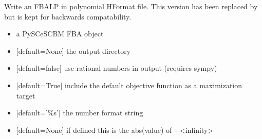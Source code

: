 \documentclass[letterpaper,10pt,english]{sphinxmanual}
\begin{document}

\begin{fulllineitems}
\label{\detokenize{modules_doc:cbmpy.CBWrite.writeModelHFormatFBA}}
\pysigstartsignatures
{}
\pysigstopsignatures
\sphinxAtStartPar
Write an FBA\sphinxhyphen{}LP in polynomial H\sphinxhyphen{}Format file. This version has been replaced by 
but is kept for backwards compatability.
\begin{itemize}
\item {} 
\sphinxAtStartPar
{} a PySCeS\sphinxhyphen{}CBM FBA object

\item {} 
\sphinxAtStartPar
{} {[}default=None{]} the output directory

\item {} 
\sphinxAtStartPar
{} {[}default=false{]} use rational numbers in output (requires sympy)

\item {} 
\sphinxAtStartPar
{} {[}default=True{]} include the default objective function as a maximization target

\item {} 
\sphinxAtStartPar
{} {[}default=’\%s’{]} the number format string

\item {} 
\sphinxAtStartPar
{} {[}default=None{]} if defined this is the abs(value) of +\sphinxhyphen{}\textless{}infinity\textgreater{}

\end{itemize}

\end{fulllineitems}
\end{document}
